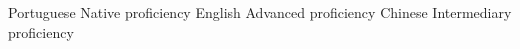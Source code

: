 
\begin{cvskills}

  \cvskill
    {Portuguese} %
    {Native proficiency} %
  \cvskill
    {English} %
    {Advanced proficiency} %
  \cvskill
    {Chinese} %
    {Intermediary proficiency} %
\end{cvskills}
